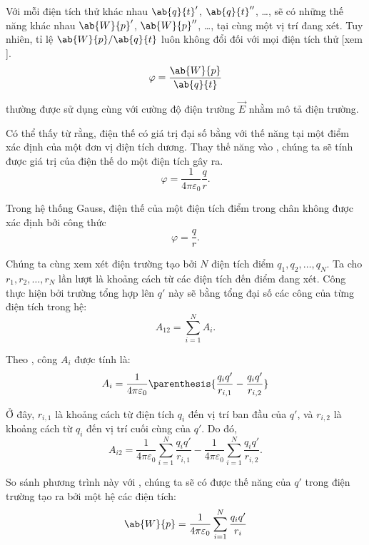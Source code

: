 Với mỗi điện tích thử khác nhau $\ab{q}{t}'$, $\ab{q}{t}''$, \ldots, sẽ có những thế năng khác nhau $\ab{W}{p}'$, $\ab{W}{p}''$, \ldots, tại cùng một vị trí đang xét. Tuy nhiên, tỉ lệ $\ab{W}{p}/\ab{q}{t}$ luôn không đổi đối với mọi điện tích thử [xem ].
\begin{equation}\label{eq:1_25}
	\varphi = \frac{\ab{W}{p}}{\ab{q}{t}}
\end{equation}

\noindent
thường được sử dụng cùng với cường độ điện trường $\vec{E}$ nhằm mô tả điện trường.

Có thể thấy từ  rằng, điện thế có giá trị đại số bằng với thế năng tại một điểm xác định của một đơn vị điện tích dương. Thay thế năng vào , chúng ta sẽ tính được giá trị của điện thế do một điện tích gây ra.
\begin{equation}\label{eq:1_26}
	\varphi = \frac{1}{4\pi\varepsilon_0} \frac{q}{r}.
\end{equation}

Trong hệ thống Gauss, điện thế của một điện tích điểm trong chân không được xác định bởi công thức
\begin{equation}\label{eq:1_27}
	\varphi = \frac{q}{r}.
\end{equation}

Chúng ta cùng xem xét điện trường tạo bởi $N$ điện tích điểm $q_1, q_2,\ldots, q_N$. Ta cho $r_1, r_2,\ldots, r_N$ lần lượt là khoảng cách từ các điện tích đến điểm đang xét. Công thực hiện bởi trường tổng hợp lên $q'$ này sẽ bằng tổng đại số các công của từng điện tích trong hệ:
\begin{equation*}
	A_{12} = \sum_{i=1}^N A_i.
\end{equation*}

\noindent
Theo , công $A_i$ được tính là:
\begin{equation*}
	A_{i} = \frac{1}{4\pi\varepsilon_0} \parenthesis{
	\frac{q_i q'}{r_{i,1}} - \frac{q_i q'}{r_{i,2}}
	}
\end{equation*}

\noindent
Ở đây, $r_{i,1}$ là khoảng cách từ điện tích $q_i$ đến vị trí ban đầu của $q'$, và $r_{i,2}$ là khoảng cách từ $q_i$ đến vị trí cuối cùng của $q'$. Do đó,
\begin{equation*}
	A_{i2} = \frac{1}{4\pi\varepsilon_0} \sum_{i=1}^N \frac{q_i q'}{r_{i,1}} - \frac{1}{4\pi\varepsilon_0} \sum_{i=1}^N \frac{q_i q'}{r_{i,2}}.
\end{equation*}

\noindent
So sánh phương trình này với , chúng ta sẽ có được thế năng của $q'$ trong điện trường tạo ra bởi một hệ các điện tích:
\begin{equation*}
	\ab{W}{p} = \frac{1}{4\pi\varepsilon_0} \sum_{i=1}^N \frac{q_i q'}{r_{i}}
\end{equation*}

